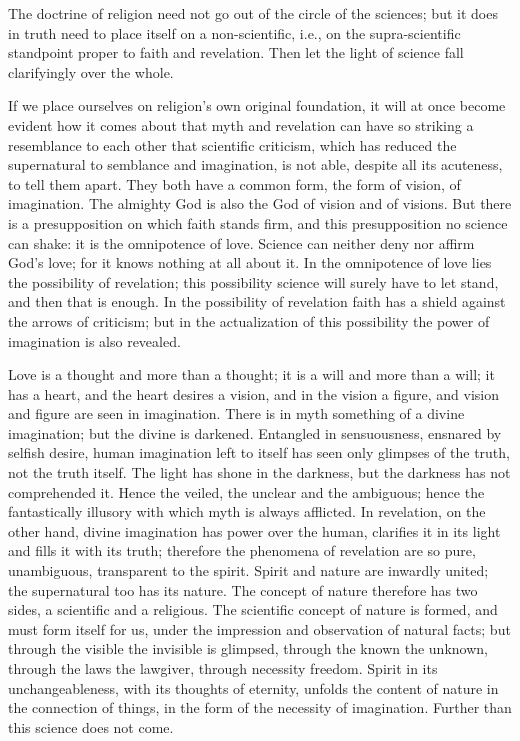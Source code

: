 \documentclass[12pt,a4paper,openany]{book}
\newcommand{\opage}[1]{\marginnote{\footnotesize\textit{[#1]}}}
\begin{document}
The doctrine of religion need not go out of the circle of the sciences; but it does in truth need to place itself on a non-scientific, i.e., on the supra-scientific standpoint proper to faith and
\setcounter{footnote}{0}%
\opage{39}revelation. Then let the light of science fall clarifyingly over the whole.

If we place ourselves on religion's own original foundation, it will at once become evident how it comes about that myth and revelation can have so striking a resemblance to each other that scientific criticism, which has reduced the supernatural to semblance and imagination, is not able, despite all its acuteness, to tell them apart. They both have a common form, the form of vision, of imagination. The almighty God is also the God of vision and of visions. But there is a presupposition on which faith stands firm, and this presupposition no science can shake: it is the omnipotence of love. Science can neither deny nor affirm God's love; for it knows nothing at all about it. In the omnipotence of love lies the possibility of revelation; this possibility science will surely have to let stand, and then that is enough. In the possibility of revelation faith has a shield against the arrows of criticism; but in the actualization of this possibility the power of imagination is also revealed.

Love is a thought and more than a thought; it is a will and more than a will; it has a heart, and the heart desires a vision, and in the vision a figure, and vision and figure are seen in imagination. There is in myth something of a divine imagination; but the divine is darkened. Entangled in sensuousness, ensnared by selfish desire, human imagination left to itself has seen only glimpses of the truth, not the truth itself. The light has shone in the darkness, but the darkness has not comprehended it. Hence the veiled, the unclear and the ambiguous;
hence the fantastically
\setcounter{footnote}{0}%
\opage{40}illusory with which myth is always afflicted. In revelation, on the other hand, divine imagination has power over the human, clarifies it in its light and fills it with its truth; therefore the phenomena of revelation are so pure, unambiguous, transparent to the spirit. Spirit and nature are inwardly united; the supernatural too has its nature. The concept of nature therefore has two sides, a scientific and a religious. The scientific concept of nature is formed, and must form itself for us, under the impression and observation of natural facts; but through the visible the invisible is glimpsed, through the known the unknown, through the laws the lawgiver, through necessity freedom. Spirit in its unchangeableness, with its thoughts of eternity, unfolds the content of nature in the connection of things, in the form of the necessity of imagination. Further than this science does not come.
\end{document}

